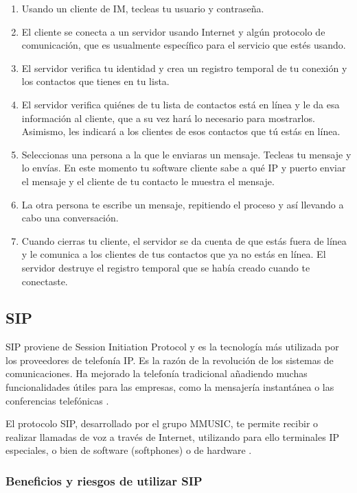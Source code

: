 \begin{enumerate}
  \item Usando un cliente de IM, tecleas tu usuario y contraseña.
  \item El cliente se conecta a un servidor usando Internet y algún protocolo de comunicación, que es usualmente específico para el servicio que estés usando.
  \item El servidor verifica tu identidad y crea un registro temporal de tu conexión y los contactos que tienes en tu lista.
  \item El servidor verifica quiénes de tu lista de contactos está en línea y le da esa información al cliente, que a su vez hará lo necesario para mostrarlos. Asimismo, les indicará a los clientes de esos contactos que tú estás en línea.
  \item Seleccionas una persona a la que le enviaras un mensaje. Tecleas tu mensaje y lo envías. En este momento tu software cliente sabe a qué IP y puerto enviar el mensaje y el cliente de tu contacto le muestra el mensaje.
  \item La otra persona te escribe un mensaje, repitiendo el proceso y así llevando a cabo una conversación.
  \item Cuando cierras tu cliente, el servidor se da cuenta de que estás fuera de línea y le comunica a los clientes de tus contactos que ya no estás en línea. El servidor destruye el registro temporal que se había creado cuando te conectaste.
\end{enumerate}

\subsection{SIP}

SIP proviene de Session Initiation Protocol y es la tecnología más utilizada por los proveedores de telefonía IP. Es la razón de la revolución de los sistemas de comunicaciones. Ha mejorado la telefonía tradicional añadiendo muchas funcionalidades útiles para las empresas, como la mensajería instantánea o las conferencias telefónicas \cite{webrtc2}.

El protocolo SIP, desarrollado por el grupo MMUSIC, te permite recibir o realizar llamadas de voz a través de Internet, utilizando para ello terminales IP especiales, o bien de software (softphones) o de hardware \cite{webrtc1}.

\subsubsection{Beneficios y riesgos de utilizar SIP}

